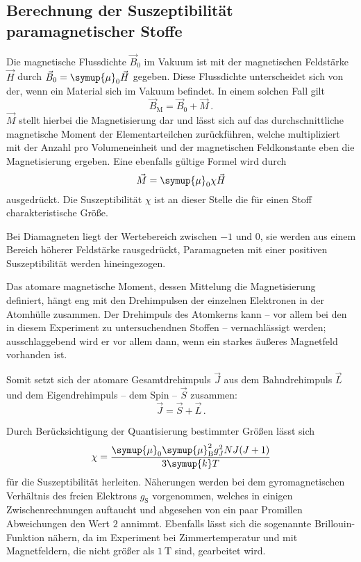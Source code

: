 \subsection{Berechnung der Suszeptibilität paramagnetischer Stoffe}

    Die magnetische Flussdichte $\vec{B}_0$ im Vakuum ist mit der magnetischen Feldstärke $\vec{H}$ durch ${\vec{B}_0=\symup{\mu}_0 \vec{H}}$
    gegeben. Diese Flussdichte unterscheidet sich von der, wenn ein Material sich im Vakuum befindet. 
    In einem solchen Fall gilt 
    \begin{equation*}
        \vec{B}_\text{M}= \vec{B}_0 + \vec{M} \,.
    \end{equation*}
    $\vec{M}$ stellt hierbei die Magnetisierung dar und lässt sich auf das durchschnittliche magnetische Moment der Elementarteilchen 
    zurückführen, welche multipliziert mit der Anzahl pro Volumeneinheit und der magnetischen Feldkonstante eben die Magnetisierung ergeben.
    Eine ebenfalls gültige Formel wird durch 
    \begin{equation*}
        \vec{M}=\symup{\mu}_0 \chi \vec{H}
    \end{equation*}
    ausgedrückt.
    Die Suszeptibilität $\chi$ ist an dieser Stelle die für einen Stoff charakteristische Größe. 

    Bei Diamagneten liegt der Wertebereich zwischen $-1$ und $0$, sie werden aus einem Bereich höherer Feldstärke rausgedrückt, 
    Paramagneten mit einer positiven Suszeptibilität werden hineingezogen. 

    Das atomare magnetische Moment, dessen Mittelung die Magnetisierung definiert, hängt eng mit den Drehimpulsen der einzelnen 
    Elektronen in der Atomhülle zusammen. 
    Der Drehimpuls des Atomkerns kann -- vor allem bei den in diesem Experiment zu untersuchendnen Stoffen -- vernachlässigt 
    werden; ausschlaggebend wird er vor allem dann, wenn ein starkes äußeres Magnetfeld vorhanden ist.

    Somit setzt sich der atomare Gesamtdrehimpuls $\vec{J}$ aus dem Bahndrehimpuls $\vec{L}$ und dem Eigendrehimpuls -- dem 
    Spin -- $\vec{S}$ zusammen:
    \begin{equation*}
        \vec{J}=\vec{S}+\vec{L} \,.
    \end{equation*}
    
    Durch Berücksichtigung der Quantisierung bestimmter Größen lässt sich 
    \begin{equation}   
        \chi = \frac{\symup{\mu}_0 \symup{\mu} _\text{B}^2 g_J^2 NJ(J+1)}{3\symup{k}T}
        \label{eqn:chii}
    \end{equation}
    für die Suszeptibilität herleiten. 
    Näherungen werden bei dem gyromagnetischen Verhältnis des freien Elektrons $g_\text{S}$ vorgenommen, welches in einigen Zwischenrechnungen auftaucht und 
    abgesehen von ein paar Promillen Abweichungen den Wert $2$ annimmt. 
    Ebenfalls lässt sich die sogenannte Brillouin-Funktion nähern, da im Experiment bei Zimmertemperatur und mit 
    Magnetfeldern, die nicht größer als $\SI{1}{\tesla}$ sind, gearbeitet wird.

